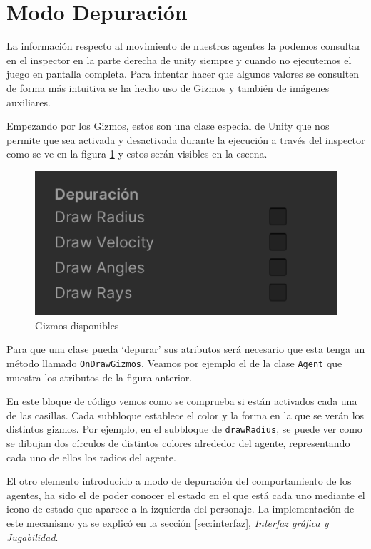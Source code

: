 \section{Modo Depuración}

La información respecto al movimiento de nuestros agentes la podemos consultar en el inspector en la parte derecha de unity siempre y cuando no ejecutemos el juego en pantalla completa. Para intentar hacer que algunos valores se consulten de forma más intuitiva se ha hecho uso de Gizmos y también de imágenes auxiliares.

Empezando por los Gizmos, estos son una clase especial de Unity que nos permite que sea activada y desactivada durante la ejecución a través del inspector como se ve en la figura \ref{fig:giz} y estos serán visibles en la escena.

\begin{figure}[H]
    \centering
    \includegraphics[scale=0.5]{images/Gizmos.png}
    \caption{Gizmos disponibles}
    \label{fig:giz}
\end{figure}

Para que una clase pueda `depurar' sus atributos será necesario que esta tenga un método llamado \texttt{OnDrawGizmos}. Veamos por ejemplo el de la clase \texttt{Agent} que muestra los atributos de la figura anterior. 



En este bloque de código vemos como se comprueba si están activados cada una de las casillas. Cada subbloque establece el color y la forma en la que se verán los distintos gizmos. Por ejemplo, en el subbloque de \texttt{drawRadius}, se puede ver como se dibujan dos círculos de distintos colores alrededor del agente, representando cada uno de ellos los radios del agente.

El otro elemento introducido a modo de depuración del comportamiento de los agentes, ha sido el de poder conocer el estado en el que está cada uno mediante el icono de estado que aparece a la izquierda del personaje. La implementación de este mecanismo ya se explicó en la sección \ref{sec:interfaz}, \textit{Interfaz gráfica y Jugabilidad}.